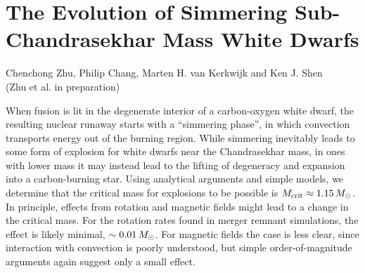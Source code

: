\chapter{The Evolution of Simmering Sub-Chandrasekhar Mass White Dwarfs}
\label{ch:ch5}

\begin{center}
\begin{minipage}[c]{4.75in}
Chenchong Zhu, Philip Chang, Marten H. van Kerkwijk and Ken J. Shen\\
(Zhu et al. in preparation)
\vspace{2em}
\end{minipage}
\end{center}

When fusion is lit in the degenerate interior of a carbon-oxygen white dwarf, the resulting nuclear runaway starts with a ``simmering phase'', in which convection transports energy out of the burning region. 
While simmering inevitably leads to some form of explosion for white dwarfs near the Chandrasekhar mass, in ones with lower mass it may instead lead to the lifting of degeneracy and expansion into a carbon-burning star.
Using analytical arguments and simple models, we determine that the critical mass for explosions to be possible is $\Mcrit \approx 1.15\,\Msun$.  In principle, effects from rotation and magnetic fields might lead to a change in the critical mass.  For the rotation rates found in merger remnant simulations, the effect is likely minimal, $\sim0.01\,\Msun$.  For magnetic fields the case is less clear, since interaction with convection is poorly understood, but simple order-of-magnitude arguments again suggest only a small effect.
